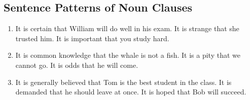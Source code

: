 \subsection{Sentence Patterns of Noun Clauses}

\begin{enumerate}
    \item {}
        \newline
        \newline
        It is certain that William will do well in his exam.
        \newline
        It is strange that she trusted him.
        \newline
        It is important that you study hard.
    \item {}
        \newline
        \newline
        It is common knowledge that the whale is not a fish.
        \newline
        It is a pity that we cannot go.
        \newline
        It is odds that he will come.
    \item {}
        \newline
        \newline
        It is generally believed that Tom is the best student in the class.
        \newline
        It is demanded that he should leave at once.
        \newline
        It is hoped that Bob will succeed.
\end{enumerate}

